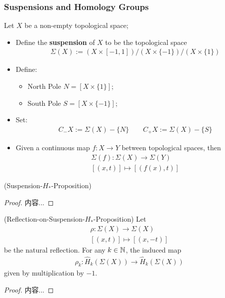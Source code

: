 \documentclass[Total.tex]{subfiles}
\begin{document}
				\subsubsection{Suspensions and Homology Groups}
					\begin{Def}
						Let $X$ be a non-empty  topological space;
						\begin{itemize}
							\item Define the \textbf{suspension} of $X$ to be the topological space
							\begin{gather*}
								\Sigma(X):=(X\times [-1,1])/(X\times \{-1\})/(X\times \{1\})
							\end{gather*} 
							\item Define:
							\begin{itemize}
								\item North Pole $N=[X\times \{1\}]$;
								\item South Pole $S=[X\times \{-1\}]$;
							\end{itemize}
							\item Set:
							\begin{gather*}
								C_-X:=\Sigma(X)-\{N\}\qquad C_+X:=\Sigma(X)-\{S\}
							\end{gather*}
							\item Given a continuous map $f:X\rightarrow Y$ between topological spaces, then 
							\begin{gather*}
								\Sigma(f):\Sigma(X)\rightarrow \Sigma(Y)\\
								[(x,t)]\mapsto [(f(x),t)]
							\end{gather*}
						\end{itemize}
					\end{Def}
					
					\begin{proposition}
						(Suspension-$H_*$-Proposition)
					\end{proposition}
					\begin{proof}
						内容...
					\end{proof}
					
					\begin{proposition}
						(Reflection-on-Suspension-$H_*$-Proposition)
						Let
						\begin{gather*}
							\rho:\Sigma(X)\rightarrow \Sigma(X)\\
							[(x,t)]\mapsto [(x,-t)]
						\end{gather*}
						be the natural reflection. For any $k\in \mathbb{N}$, the induced map
						\begin{gather*}
							\rho_k:\hat{H}_k(\Sigma(X))\rightarrow \hat{H}_k(\Sigma(X))
						\end{gather*}
						given by multiplication by $-1$.
					\end{proposition}
					\begin{proof}
						内容...
					\end{proof}
\end{document}
